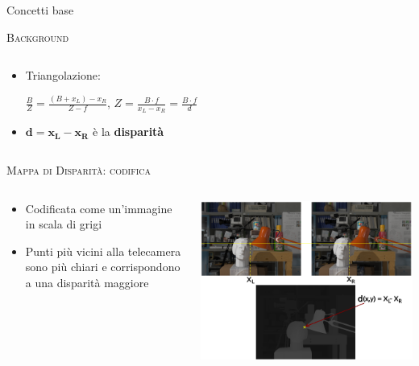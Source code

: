 \documentclass{beamer}
\begin{document}
\begin{section}{Concetti base}
\begin{frame}[t]{\textsc{Background}}
\begin{columns}
\begin{column}{5cm}
\begin{itemize}
\item \small{Triangolazione}:
\begin{center}
 $\frac{B}{Z} = \frac{(B+x_{L}) - x_{R}}{Z-f}$,
$Z = \frac{B \cdot f}{x_{L} - x_{R}} = \frac{B \cdot f}{d}$
\end{center}
\item  $\mathbf{d = x_{L} - x_{R}} $ \`{e} la \textbf{disparit\`{a}} 
\end{itemize}
\end{column}
\end{columns}
\end{frame}




\begin{frame}[t]{\textsc{Mappa di Disparit\`{a}: codifica}}
\begin{columns}
\hspace*{-4em}
\begin{column}{5cm}
\vspace{1em}
\begin{itemize}
\item  Codificata come un'immagine in scala di grigi
\item  Punti pi\`{u} vicini alla telecamera sono pi\`{u} chiari e corrispondono a una disparit\`{a} maggiore 
\end{itemize}
\end{column}
\hspace*{-3em}
\begin{column}{5.5cm}
\vspace{2em}
\centering
\includegraphics[width=1.2\linewidth]{./img/disparity.png}
\end{column}
\end{columns}
\end{frame}



\end{section}
\end{document}
